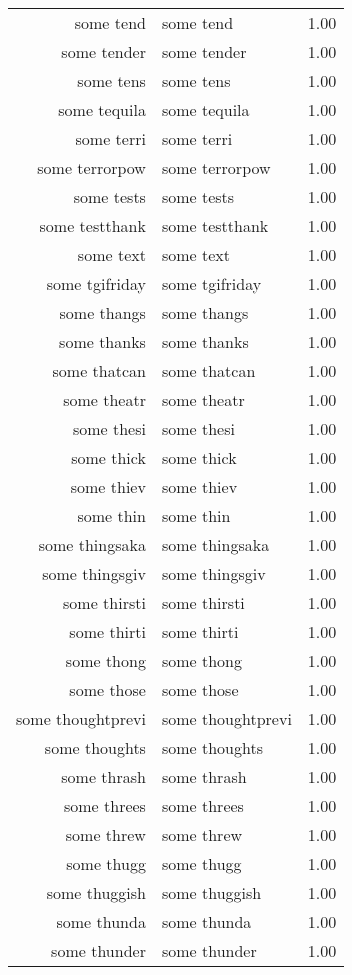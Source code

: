 \begin{table}[ht]
\begin{tabular}{rlr}
  some tend & some tend & 1.00 \\ 
  some tender & some tender & 1.00 \\ 
  some tens & some tens & 1.00 \\ 
  some tequila & some tequila & 1.00 \\ 
  some terri & some terri & 1.00 \\ 
  some terrorpow & some terrorpow & 1.00 \\ 
  some tests & some tests & 1.00 \\ 
  some testthank & some testthank & 1.00 \\ 
  some text & some text & 1.00 \\ 
  some tgifriday & some tgifriday & 1.00 \\ 
  some thangs & some thangs & 1.00 \\ 
  some thanks & some thanks & 1.00 \\ 
  some thatcan & some thatcan & 1.00 \\ 
  some theatr & some theatr & 1.00 \\ 
  some thesi & some thesi & 1.00 \\ 
  some thick & some thick & 1.00 \\ 
  some thiev & some thiev & 1.00 \\ 
  some thin & some thin & 1.00 \\ 
  some thingsaka & some thingsaka & 1.00 \\ 
  some thingsgiv & some thingsgiv & 1.00 \\ 
  some thirsti & some thirsti & 1.00 \\ 
  some thirti & some thirti & 1.00 \\ 
  some thong & some thong & 1.00 \\ 
  some those & some those & 1.00 \\ 
  some thoughtprevi & some thoughtprevi & 1.00 \\ 
  some thoughts & some thoughts & 1.00 \\ 
  some thrash & some thrash & 1.00 \\ 
  some threes & some threes & 1.00 \\ 
  some threw & some threw & 1.00 \\ 
  some thugg & some thugg & 1.00 \\ 
  some thuggish & some thuggish & 1.00 \\ 
  some thunda & some thunda & 1.00 \\ 
  some thunder & some thunder & 1.00 \\ 

\end{tabular}
\end{table}
